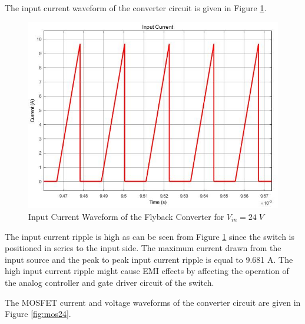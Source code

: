 The input current waveform of the converter circuit is given in Figure \ref{fig:incurr24}.

\begin{figure}[H]
\begin{center}
\includegraphics[width=1\textwidth]{input_current_24.jpg}
\caption{Input Current Waveform of the Flyback Converter for $ V_{in} = 24\;V $}
\label{fig:incurr24}
\end{center}
\end{figure}

The input current ripple is high as can be seen from Figure \ref{fig:incurr24} since the switch is positioned in series to the input side. The maximum current drawn from the input source and the peak to peak input current ripple is equal to 9.681 A. The high input current ripple might cause EMI effects by affecting the operation of the analog controller and gate driver circuit of the switch.

The MOSFET current and voltage waveforms of the converter circuit are given in Figure \ref{fig:mos24}.

